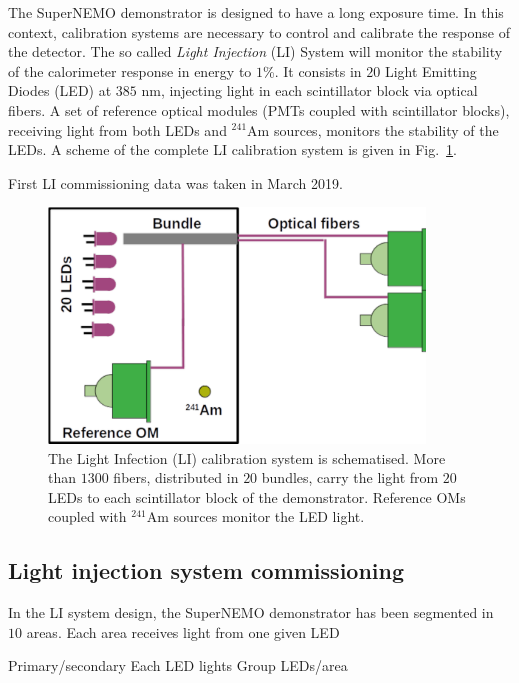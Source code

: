 The SuperNEMO demonstrator is designed to have a long exposure time.
In this context, calibration systems are necessary to control and calibrate the response of the detector.
The so called \emph{Light Injection} (LI) System will monitor the stability of the calorimeter response in energy to $1$\%.
It consists in $20$ Light Emitting Diodes (LED) at $385$ nm, injecting light in each scintillator block via optical fibers.
A set of reference optical modules (PMTs coupled with scintillator blocks), receiving light from both LEDs and $^{241}$Am sources, monitors the stability of the LEDs.
A scheme of the complete LI calibration system is given in Fig.~\ref{fig:LIS_scheme}.

First LI commissioning data was taken in March 2019.



\begin{figure}[h]
  \centering
  \includegraphics[width=10cm]{commissioning/fig_commissioning/LIS_scheme.pdf}

  \caption{The Light Infection (LI) calibration system is schematised.
    More than $1300$ fibers, distributed in $20$ bundles, carry the light from $20$ LEDs to each scintillator block of the demonstrator.
    Reference OMs coupled with $^{241}$Am sources monitor the LED light.
    \label{fig:LIS_scheme}}
\end{figure}

\subsection{Light injection system commissioning}


In the LI system design, the SuperNEMO demonstrator has been segmented in $10$ areas.
Each area receives light from one given LED

Primary/secondary
Each LED lights
Group LEDs/area

